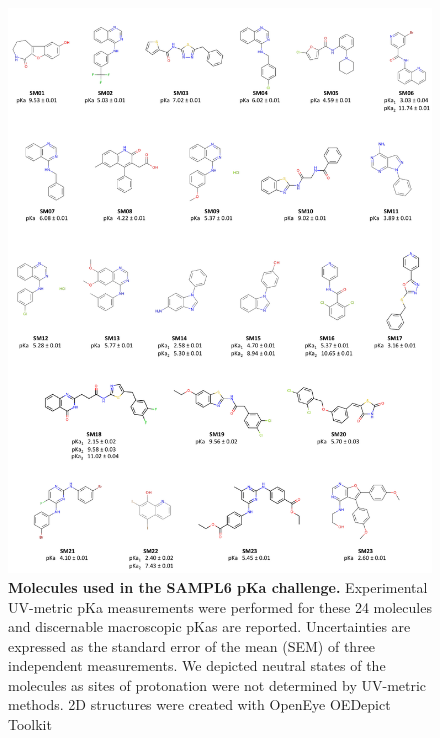 \documentclass[9pt,lineno]{elife}
\begin{document}
\begin{figure}
\includegraphics[width=1.00\linewidth]{figures/SAMPL6_pKa_molecules_fig}
\caption{{\bf Molecules used in the SAMPL6 pKa challenge.} 
Experimental UV-metric pKa measurements were performed for these 24 molecules and discernable macroscopic pKas are reported. 
Uncertainties are expressed as the standard error of the mean (SEM) of three independent measurements. We depicted neutral states of the molecules as sites of protonation were not determined by UV-metric methods.
2D structures were created with OpenEye OEDepict Toolkit~\citep{oedepict_openeye_2017}
}
\label{fig:pKa_molecules}
\end{figure}
\end{document}
